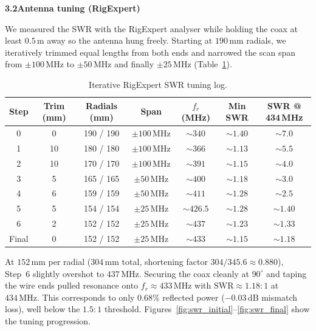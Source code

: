 \documentclass[12pt,a4paper]{article}
\begin{document}
\par\medskip
\noindent\textbf{3.2}\quad\textbf{Antenna tuning (RigExpert)}

We measured the SWR with the RigExpert analyser while holding the coax at least $0.5\,\mathrm{m}$ away so the antenna hung freely. Starting at $190\,\mathrm{mm}$ radials, we iteratively trimmed equal lengths from both ends and narrowed the scan span from $\pm 100\,\mathrm{MHz}$ to $\pm 50\,\mathrm{MHz}$ and finally $\pm 25\,\mathrm{MHz}$ (Table~\ref{tab:tuning}).

\begin{table}[H]
    \centering
    \small
    \begin{tabular}{c c c c c c c}
        \toprule
        \textbf{Step} & \textbf{Trim (mm)} & \textbf{Radials (mm)} & \textbf{Span} & \textbf{$f_r$ (MHz)} & \textbf{Min SWR} & \textbf{SWR @ 434\,MHz} \\
        \midrule
        0 & 0  & 190 / 190 & $\pm 100\,\mathrm{MHz}$ & $\sim 340$   & $\sim 1.40$ & $\sim 7.0$  \\
        1 & 10 & 180 / 180 & $\pm 100\,\mathrm{MHz}$ & $\sim 366$   & $\sim 1.13$ & $\sim 5.5$  \\
        2 & 10 & 170 / 170 & $\pm 100\,\mathrm{MHz}$ & $\sim 391$   & $\sim 1.15$ & $\sim 4.0$  \\
        3 & 5  & 165 / 165 & $\pm 50\,\mathrm{MHz}$  & $\sim 400$   & $\sim 1.18$ & $\sim 3.0$  \\
        4 & 6  & 159 / 159 & $\pm 50\,\mathrm{MHz}$  & $\sim 411$   & $\sim 1.28$ & $\sim 2.5$  \\
        5 & 5  & 154 / 154 & $\pm 25\,\mathrm{MHz}$  & $\sim 426.5$ & $\sim 1.28$ & $\sim 1.40$ \\
        6 & 2  & 152 / 152 & $\pm 25\,\mathrm{MHz}$  & $\sim 437$   & $\sim 1.23$ & $\sim 1.33$ \\
        Final & 0 & 152 / 152 & $\pm 25\,\mathrm{MHz}$ & $\sim 433$ & $\sim 1.15$ & $\sim 1.18$ \\
        \bottomrule
    \end{tabular}
    \caption{Iterative RigExpert SWR tuning log.}
    \label{tab:tuning}
\end{table}

At $152\,\mathrm{mm}$ per radial ($304\,\mathrm{mm}$ total, shortening factor $304/345.6 \approx 0.880$), Step~6 slightly overshot to $437\,\mathrm{MHz}$. Securing the coax cleanly at $90^\circ$ and taping the wire ends pulled resonance onto $f_r \approx 433\,\mathrm{MHz}$ with $\mathrm{SWR} \approx 1.18:1$ at $434\,\mathrm{MHz}$. This corresponds to only $0.68\%$ reflected power ($-0.03\,\mathrm{dB}$ mismatch loss), well below the $1.5:1$ threshold. Figures~\ref{fig:swr_initial}--\ref{fig:swr_final} show the tuning progression.
\end{document}
